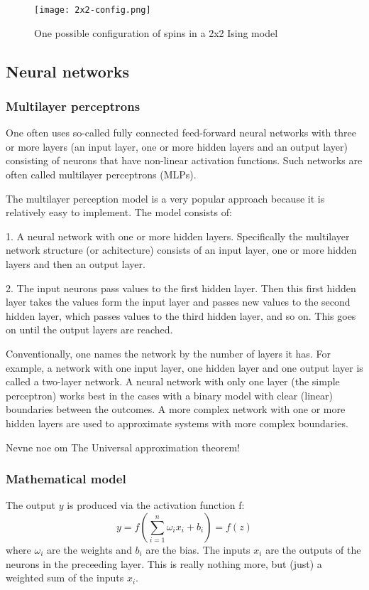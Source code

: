 \documentclass[a4paper,12pt]{article}
\begin{document}
\begin{figure}[h!]
  \centering
  \caption{One possible configuration of spins in a 2x2 Ising model}
  \texttt{[image: 2x2-config.png]}
\end{figure}

\subsection{Neural networks}
\subsubsection{Multilayer perceptrons}
One often uses so-called fully connected feed-forward neural networks with three or more layers (an input layer, one or more hidden layers and an output layer) consisting of neurons that have non-linear activation functions. Such networks are often called multilayer perceptrons (MLPs).\newline

The multilayer perception model is a very popular approach because it is relatively easy to implement. The model consists of:\newline

1. A neural network with one or more hidden layers. Specifically the multilayer network structure (or achitecture) consists of an input layer, one or more hidden layers and then an output layer.\newline

2. The input neurons pass values to the first hidden layer. Then this first hidden layer takes the values form the input layer and passes new values to the second hidden layer, which passes values to the third hidden layer, and so on. This goes on until the output layers are reached. \newline

Conventionally, one names the network by the number of layers it has. For example, a network with one input layer, one hidden layer and one output layer is called a two-layer network. A neural network with only one layer (the simple perceptron) works best in the cases with a binary model with clear (linear) boundaries between the outcomes. A more complex network with one or more hidden layers are used to approximate systems with more complex boundaries.

Nevne noe om The Universal approximation theorem!


\subsubsection{Mathematical model}
The output $y$ is produced via the activation function f:
\begin{equation}
    y = f( \sum_{i=1}^n{\omega_i x_i + b_i} ) = f(z)
\end{equation}
where $\omega_i$ are the weights and $b_i$ are the bias. The inputs $x_i$ are the outputs of the neurons in the preceeding layer.\newline
This is really nothing more, but (just) a weighted sum of the inputs $x_i$.\newline
\end{document}
